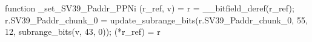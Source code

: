 function _set_SV39_Paddr_PPNi (r_ref, v) = {
    r = __bitfield_deref(r_ref);
    r.SV39_Paddr_chunk_0 = update_subrange_bits(r.SV39_Paddr_chunk_0, 55, 12, subrange_bits(v, 43, 0));
    (*r_ref) = r
}

